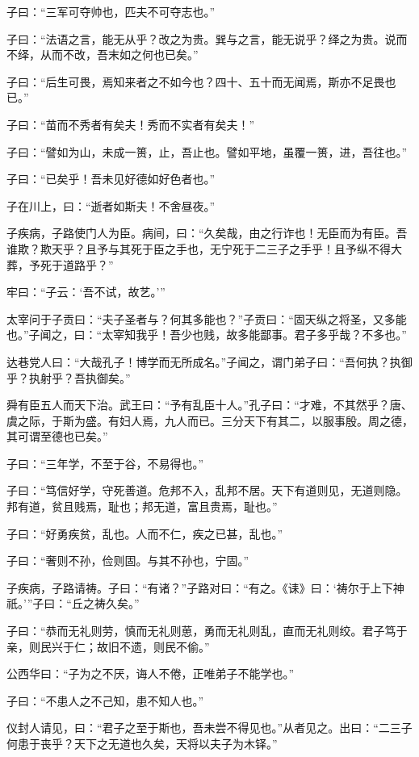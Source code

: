 \documentclass[a5paper]{ctexbook}
\begin{document}
    子曰：“三军可夺帅也，匹夫不可夺志也。”

    子曰：“法语之言，能无从乎？改之为贵。巽与之言，能无说乎？绎之为贵。说而不绎，从而不改，吾末如之何也已矣。”

    子曰：“后生可畏，焉知来者之不如今也？四十、五十而无闻焉，斯亦不足畏也已。”

    子曰：“苗而不秀者有矣夫！秀而不实者有矣夫！”

    子曰：“譬如为山，未成一篑，止，吾止也。譬如平地，虽覆一篑，进，吾往也。”

    子曰：“已矣乎！吾未见好德如好色者也。”

    子在川上，曰：“逝者如斯夫！不舍昼夜。”

    子疾病，子路使门人为臣。病间，曰：“久矣哉，由之行诈也！无臣而为有臣。吾谁欺？欺天乎？且予与其死于臣之手也，无宁死于二三子之手乎！且予纵不得大葬，予死于道路乎？”

    牢曰：“子云：‘吾不试，故艺。’”

    太宰问于子贡曰：“夫子圣者与？何其多能也？”子贡曰：“固天纵之将圣，又多能也。”子闻之，曰：“太宰知我乎！吾少也贱，故多能鄙事。君子多乎哉？不多也。”

    达巷党人曰：“大哉孔子！博学而无所成名。”子闻之，谓门弟子曰：“吾何执？执御乎？执射乎？吾执御矣。”

    舜有臣五人而天下治。武王曰：“予有乱臣十人。”孔子曰：“才难，不其然乎？唐、虞之际，于斯为盛。有妇人焉，九人而已。三分天下有其二，以服事殷。周之德，其可谓至德也已矣。”

    

    子曰：“三年学，不至于谷，不易得也。”

    子曰：“笃信好学，守死善道。危邦不入，乱邦不居。天下有道则见，无道则隐。邦有道，贫且贱焉，耻也；邦无道，富且贵焉，耻也。”

    子曰：“好勇疾贫，乱也。人而不仁，疾之已甚，乱也。”

    子曰：“奢则不孙，俭则固。与其不孙也，宁固。”

    子疾病，子路请祷。子曰：“有诸？”子路对曰：“有之。《诔》曰：‘祷尔于上下神祇。’”子曰：“丘之祷久矣。”

    子曰：“恭而无礼则劳，慎而无礼则葸，勇而无礼则乱，直而无礼则绞。君子笃于亲，则民兴于仁；故旧不遗，则民不偷。”
    
    公西华曰：“子为之不厌，诲人不倦，正唯弟子不能学也。”

    子曰：“不患人之不己知，患不知人也。”

    仪封人请见，曰：“君子之至于斯也，吾未尝不得见也。”从者见之。出曰：“二三子何患于丧乎？天下之无道也久矣，天将以夫子为木铎。”
\end{document}
